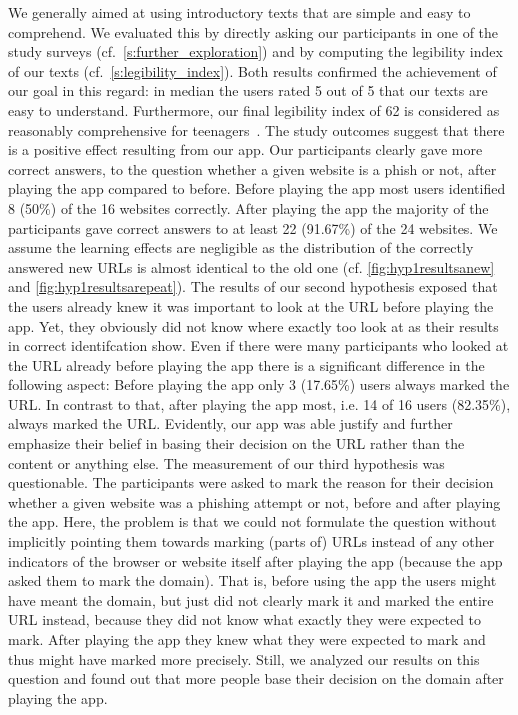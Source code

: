 We generally aimed at using introductory texts that are simple and easy to comprehend.
We evaluated this by directly asking our participants in one of the study surveys (cf.~\autoref{s:further_exploration}) and by computing the legibility index of our texts (cf.~\autoref{s:legibility_index}). Both results confirmed the achievement of our goal in this regard: in median the users rated 5 out of 5 that our texts are easy to understand. Furthermore, our final legibility index of 62 is considered as reasonably comprehensive for teenagers~\cite{amstad1978verstandlich}.
The study outcomes suggest that there is a positive effect resulting from our app.
Our participants clearly gave more correct answers, to the question whether a given website is a phish or not, after playing the app compared to before.
Before playing the app most users identified 8 (50\%) of the 16 websites correctly.
After playing the app the majority of the participants gave correct answers to at least 22 (91.67\%) of the 24 websites.
We assume the learning effects are negligible as the distribution of the correctly answered new URLs is almost identical to the old one (cf. \autoref{fig:hyp1resultsanew} and \autoref{fig:hyp1resultsarepeat}).
The results of our second hypothesis exposed that the users already knew it was important to look at the URL before playing the app.
Yet, they obviously did not know where exactly too look at as their results in correct identifcation show.
Even if there were many participants who looked at the URL already before playing the app there is a significant difference in the following aspect:
Before playing the app only 3 (17.65\%) users always marked the URL.
In contrast to that, after playing the app most, i.e. 14 of 16 users (82.35\%), always marked the URL.
Evidently, our app was able justify and further emphasize their belief in basing their decision on the URL rather than the content or anything else.
The measurement of our third hypothesis was questionable.
The participants were asked to mark the reason for their decision whether a given website was a phishing attempt or not, before and after playing the app. 
Here, the problem is that we could not formulate the question without implicitly pointing them towards marking (parts of) URLs instead of any other indicators of the browser or website itself after playing the app (because the app asked them to mark the domain). That is, before using the app the users might have meant the domain, but just did not clearly mark it and marked the entire URL instead, because they did not know what exactly they were expected to mark. 
After playing the app they knew what they were expected to mark and thus might have marked more precisely.
Still, we analyzed our results on this question and found out that more people base their decision on the domain after playing the app.

